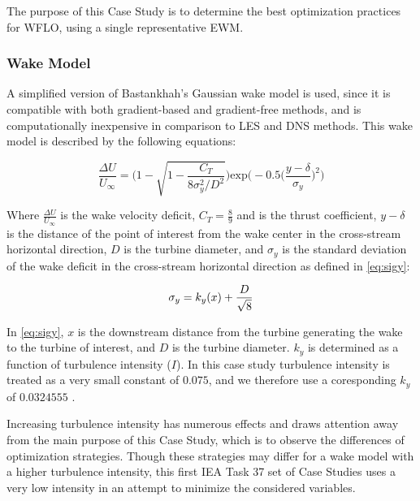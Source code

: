 The purpose of this Case Study is to determine the best optimization practices for WFLO, using a single representative EWM.
    
    \subsubsection{Wake Model} \label{sec:wakemodel}
        A simplified version of Bastankhah's Gaussian wake model \cite{Bastankhah2016, Thomas2018} is used, since it is compatible with both gradient-based and gradient-free methods, and is computationally inexpensive in comparison to LES and DNS methods.
        This wake model is described by the following equations:

        \begin{equation}
            \frac{\Delta U}{U_{\infty}}
            =
            \Bigg(
            1 - \sqrt{
                1 - \frac{C_T}
                {8\sigma_{y}^{2}/D^2}
            }
            \Bigg)
            \text{exp}\bigg(
            -0.5\Big(
                \frac{y-\delta}{\sigma_{y}}
                \Big)^2
            \bigg)
        \end{equation}

        \noindent Where $\frac{\Delta U}{U_{\infty}}$ is the wake velocity deficit, $C_T = \frac{8}{9}$ and is the thrust coefficient, $y-\delta$ is the distance of the point of interest from the wake center in the cross-stream horizontal direction, $D$ is the turbine diameter, and $\sigma_y$ is the standard deviation of the wake deficit in the cross-stream horizontal direction as defined in \cref{eq:sigy}:

        \begin{equation}
            \sigma_y = k_y(x) + \frac{D}{\sqrt{8}} \\
            \label{eq:sigy}
        \end{equation}

        In \cref{eq:sigy}, $x$ is the downstream distance from the turbine generating the wake to the turbine of interest, and $D$ is the turbine diameter. $k_y$ is determined as a function of turbulence intensity ($I$).
        In this case study turbulence intensity is treated as a very small constant of $0.075$, and we therefore use a coresponding $k_{y}$ of $0.0324555$ \cite{Niayifar2016, ThomasBast2018}.

        Increasing turbulence intensity has numerous effects and draws attention away from the main purpose of this Case Study, which is to observe the differences of optimization strategies.
        Though these strategies may differ for a wake model with a higher turbulence intensity, this first IEA Task 37 set of Case Studies uses a very low intensity in an attempt to minimize the considered variables.

